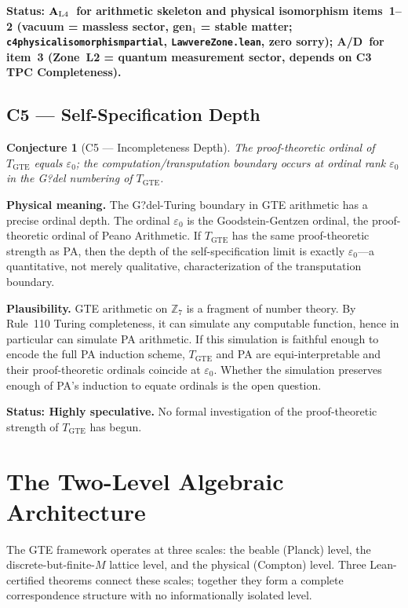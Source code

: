 \documentclass[12pt,letterpaper]{article}
\newtheorem{conjecture}[theorem]{Conjecture}
\newcommand{\Zseven}{\mathbb{Z}_7}
\newcommand{\epszero}{\varepsilon_0}
\newcommand{\TGTE}{T_{\mathrm{GTE}}}
\newcommand{\catAL}{\ensuremath{\textbf{A}_{\rm L4}}}
\newcommand{\catAD}{\textbf{A/D}}
\newcommand{\lean}[1]{%
  \penalty-100
  \begingroup\def\_{\textunderscore\allowbreak}\texttt{#1}\endgroup}
\begin{document}
\noindent\textbf{Status: \catAL\ for arithmetic skeleton and physical isomorphism
items~1--2 (vacuum = massless sector, gen$_1$ = stable matter;
\lean{c4\_physical\_isomorphism\_partial}, \lean{LawvereZone.lean}, zero sorry);
\catAD\ for item~3 (Zone~L2 = quantum measurement sector, depends on C3
TPC Completeness).}

\subsection{C5 --- Self-Specification Depth}
\label{sec:C5}

\begin{conjecture}[C5 --- Incompleteness Depth]
\label{conj:C5}
The proof-theoretic ordinal of $\TGTE$ equals $\epszero$; the
computation/transputation boundary occurs at ordinal rank $\epszero$ in
the G?del numbering of $\TGTE$.
\end{conjecture}

\noindent\textbf{Physical meaning.}  The G?del-Turing boundary in GTE arithmetic
has a precise ordinal depth.  The ordinal $\varepsilon_0$ is the
Goodstein-Gentzen ordinal, the proof-theoretic ordinal of Peano Arithmetic.  If
$\TGTE$ has the same proof-theoretic strength as PA, then the depth of the
self-specification limit is exactly $\varepsilon_0$---a quantitative, not merely
qualitative, characterization of the transputation boundary.

\noindent\textbf{Plausibility.}  GTE arithmetic on $\Zseven$ is a fragment of
number theory.  By Rule~110 Turing completeness, it can simulate any computable
function, hence in particular can simulate PA arithmetic.  If this simulation is
faithful enough to encode the full PA induction scheme, $\TGTE$ and PA are
equi-interpretable and their proof-theoretic ordinals coincide at $\varepsilon_0$.
Whether the simulation preserves enough of PA's induction to equate ordinals is
the open question.

\noindent\textbf{Status: Highly speculative.}  No formal investigation of the
proof-theoretic strength of $\TGTE$ has begun.

\section{The Two-Level Algebraic Architecture}
\label{sec:lifting-architecture}

The GTE framework operates at three scales: the beable (Planck) level, the
discrete-but-finite-$M$ lattice level, and the physical (Compton) level.
Three Lean-certified theorems connect these scales; together they form a
complete correspondence structure with no informationally isolated level.
\end{document}
